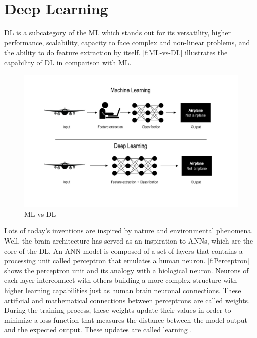 \section{Deep Learning}
\label{s:Second-Background-Deep-Learning}

\ac{DL} is a subcategory of the \ac{ML} which stands out for its versatility, higher performance, scalability, capacity to face complex and non-linear problems, and the ability to do feature extraction by itself. \autoref{f:ML-vs-DL} illustrates the capability of \ac{DL} in comparison with \ac{ML}. 

\begin{figure}[h]
\centering
\includegraphics[width=\linewidth]{figures/Ch2/MLvsDL.pdf}
\caption{ML vs DL}
\label{f:ML-vs-DL}
\end{figure}

Lots of today's inventions are inspired by nature and environmental phenomena. Well, the brain architecture has served as an inspiration to \ac{ANN}s, which are the core of the \ac{DL}. An \ac{ANN} model is composed of a set of layers that contains a processing unit called perceptron that emulates a human neuron. \autoref{f:Perceptron} shows the perceptron unit and its analogy with a biological neuron. Neurons of each layer interconnect with others building a more complex structure with higher learning capabilities just as human brain neuronal connections. These artificial and mathematical connections between perceptrons are called weights. During the training process, these weights update their values in order to minimize a loss function that measures the distance between the model output and the expected output. These updates are called learning \cite{Chollet2018}. 

